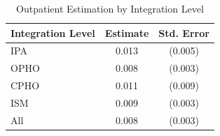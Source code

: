 \begin{table}[ht!]

\caption{\label{tab:het_int}Outpatient Estimation by Integration Level}
\centering
\begin{tabular}[t]{lcc}
\toprule
Integration Level & Estimate & Std. Error\\
\midrule
IPA & 0.013 & (0.005)\\
OPHO & 0.008 & (0.003)\\
CPHO & 0.011 & (0.009)\\
ISM & 0.009 & (0.003)\\
All & 0.008 & (0.003)\\
\bottomrule
\end{tabular}
\end{table}
